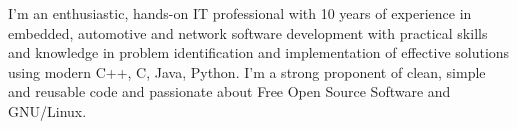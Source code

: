 \documentclass[letter,10pt]{article}
\begin{document}

I'm an enthusiastic, hands-on IT professional with 10 years of experience in embedded, automotive and network software development with practical skills and knowledge in problem identification and implementation of effective solutions using modern C++, C, Java, Python. I'm a strong proponent of clean, simple and reusable code and passionate about Free Open Source Software and GNU/Linux.
\end{document}
